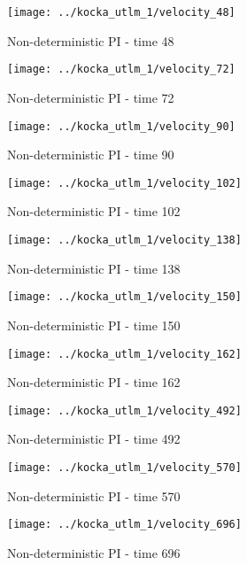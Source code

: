 \begin{figure}[h]
 \centering 
 \texttt{[image: ../kocka\_utlm\_1/velocity\_48]}
 \caption{Non-deterministic PI - time 48}
\end{figure}


\begin{figure}[h]
 \centering 
 \texttt{[image: ../kocka\_utlm\_1/velocity\_72]}
 \caption{Non-deterministic PI - time 72}
\end{figure}


\begin{figure}[h]
 \centering 
 \texttt{[image: ../kocka\_utlm\_1/velocity\_90]}
 \caption{Non-deterministic PI - time 90}
\end{figure}

\begin{figure}[h]
 \centering 
 \texttt{[image: ../kocka\_utlm\_1/velocity\_102]}
 \caption{Non-deterministic PI - time 102}
\end{figure}

\begin{figure}[h]
 \centering 
 \texttt{[image: ../kocka\_utlm\_1/velocity\_138]}
 \caption{Non-deterministic PI - time 138}
\end{figure}

\begin{figure}[h]
 \centering 
 \texttt{[image: ../kocka\_utlm\_1/velocity\_150]}
 \caption{Non-deterministic PI - time 150}
\end{figure}


\begin{figure}[h]
 \centering \label{brok}
 \texttt{[image: ../kocka\_utlm\_1/velocity\_162]}
 \caption{Non-deterministic PI - time 162}
\end{figure}


\begin{figure}[h]
 \centering 
 \texttt{[image: ../kocka\_utlm\_1/velocity\_492]}
 \caption{Non-deterministic PI - time 492}
\end{figure}

\begin{figure}[h]
 \centering 
 \texttt{[image: ../kocka\_utlm\_1/velocity\_570]}
 \caption{Non-deterministic PI - time 570}
\end{figure}

\begin{figure}[h]
 \centering 
 \texttt{[image: ../kocka\_utlm\_1/velocity\_696]}
 \caption{Non-deterministic PI - time 696}
\end{figure}

